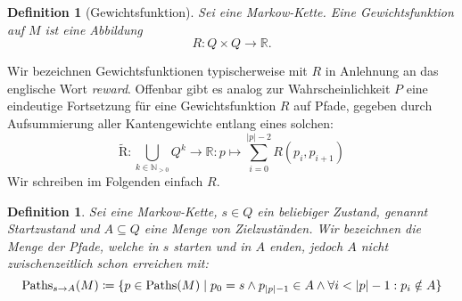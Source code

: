 \documentclass[a4paper]{article}
\newcommand{\mc}{Markow-Kette}
\newtheorem{definition}[satz]{Definition} %
\theoremstyle{nonumberplain}
\begin{document}
\newcommand{\reward}{Gewichtsfunktion}
\begin{definition}[\reward]
	Sei \mcex{} eine \mc{}. Eine \reward{} auf $M$ ist eine Abbildung
	\begin{equation}
	R : Q \times Q \to \mathbb{R}\text{.}
	\end{equation} 
\end{definition}
Wir bezeichnen Gewichtsfunktionen typischerweise mit $R$ in Anlehnung an das englische Wort \textit{reward}.
Offenbar gibt es analog zur Wahrscheinlichkeit $P$ eine eindeutige Fortsetzung für eine \reward{} $R$ auf Pfade, gegeben durch Aufsummierung aller Kantengewichte entlang eines solchen:
\begin{equation}
	\mathrm{\tilde{R}} : \bigcup_{k \in \mathbb{N}_{>0}}{Q^k} \to \mathbb{R} : p \mapsto \sum_{i = 0}^{|p| - 2}{R(p_i,p_{i+1})}
\end{equation}
Wir schreiben im Folgenden einfach $R$.
\begin{definition}\label{def-path-to}
	Sei \mcex{} eine \mc{}, $s \in Q$ ein beliebiger Zustand, genannt Startzustand und $A \subseteq Q$ eine Menge von Zielzuständen. Wir bezeichnen die Menge der Pfade, welche in $s$ starten und in $A$ enden, jedoch $A$ nicht zwischenzeitlich schon erreichen mit:
	\begin{equation}
		\mathrm{Paths}_{s \rightarrow A}(M) \coloneqq \{ p \in \mathrm{Paths}(M) \mid p_0 = s \land p_{|p|-1} \in A \land \forall i < |p| - 1 : p_i \notin A \}
	\end{equation}
	
\end{definition}
\end{document}
